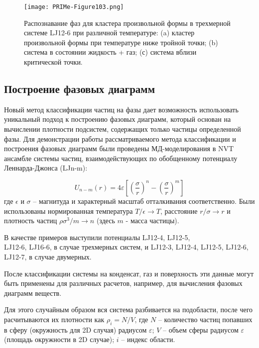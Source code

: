 \begin{figure}[!t]
  \centering
  \texttt{[image: PRIMe-Figure103.png]}
  \caption{Распознавание фаз для кластера произвольной формы в трехмерной системе LJ12-6 при различной температуре: (a) кластер произвольной формы при температуре ниже тройной точки; (b) система в состоянии жидкость + газ; (с) система вблизи критической точки.}
  \label{D3_free_conf}
\end{figure}



\subsection{Построение фазовых диаграмм}
\label{PRIMe-SubSecPhaseDiagram}

Новый метод классификации частиц на фазы дает возможность использовать уникальный подход к построению фазовых диаграмм, который основан на вычислении плотности подсистем, содержащих только частицы определенной фазы.
Для демонстрации работы рассматриваемого метода классификации и построения фазовых диаграмм были проведены МД-моделирования в NVT ансамбле системы частиц, взаимодействующих по обобщенному потенциалу Леннарда-Джонса (LJn-m):

\begin{equation}
  U_{n-m}(r)=4 \varepsilon\left[\left(\frac{\sigma}{r}\right)^{n}-\left(\frac{\sigma}{r}\right)^{m}\right]
  \label{MACR-eq1}
\end{equation}
где $\epsilon$ и $\sigma$ -- магнитуда и характерный масштаб отталкивания соответственно.
Были использованы нормированная температура $ T/ \epsilon \rightarrow T $, расстояние $ r/ \sigma \rightarrow r $ и плотность частиц $ \rho \sigma ^ 3 / m \rightarrow n$ (здесь $ m $ - масса частицы). 

В качестве примеров выступили потенциалы LJ12-4, LJ12-5, \\ LJ12-6, LJ16-6, в случае трехмерных систем, и LJ12-3, LJ12-4, LJ12-5, LJ12-6, LJ12-7, в случае двумерных.

После классификации системы на конденсат, газ и поверхность эти данные могут быть применены для различных расчетов, например, для вычисления фазовых диаграмм веществ.

Для этого случайным образом вся система разбивается на подобласти, после чего расчитываются их плотности как $\rho_i = N / V$, где $N$ -- количество частиц попавших в сферу (окружность для 2D случая) радиусом $\varepsilon$; $V$ -- объем сферы радиусом $\varepsilon$ (площадь окружности в 2D случае); $i$ -- индекс области.

